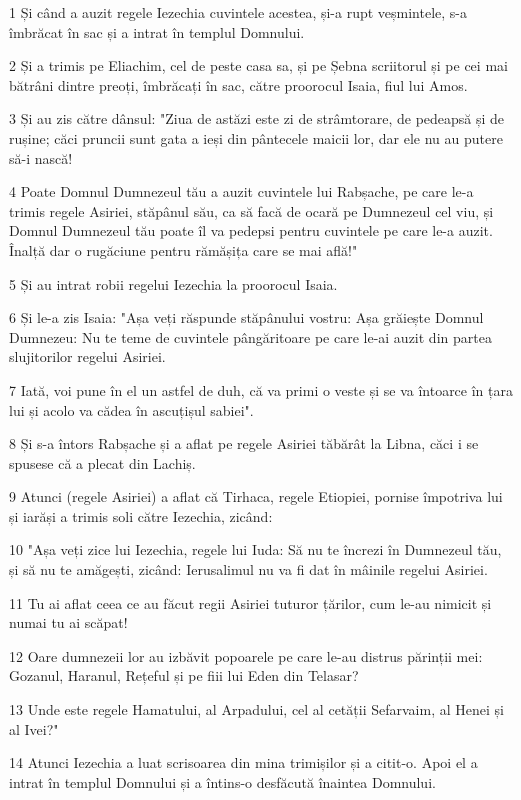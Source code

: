 \par 1 Și când a auzit regele Iezechia cuvintele acestea, și-a rupt veșmintele, s-a îmbrăcat în sac și a intrat în templul Domnului.
\par 2 Și a trimis pe Eliachim, cel de peste casa sa, și pe Șebna scriitorul și pe cei mai bătrâni dintre preoți, îmbrăcați în sac, către proorocul Isaia, fiul lui Amos.
\par 3 Și au zis către dânsul: "Ziua de astăzi este zi de strâmtorare, de pedeapsă și de rușine; căci pruncii sunt gata a ieși din pântecele maicii lor, dar ele nu au putere să-i nască!
\par 4 Poate Domnul Dumnezeul tău a auzit cuvintele lui Rabșache, pe care le-a trimis regele Asiriei, stăpânul său, ca să facă de ocară pe Dumnezeul cel viu, și Domnul Dumnezeul tău poate îl va pedepsi pentru cuvintele pe care le-a auzit. Înalță dar o rugăciune pentru rămășița care se mai află!"
\par 5 Și au intrat robii regelui Iezechia la proorocul Isaia.
\par 6 Și le-a zis Isaia: "Așa veți răspunde stăpânului vostru: Așa grăiește Domnul Dumnezeu: Nu te teme de cuvintele pângăritoare pe care le-ai auzit din partea slujitorilor regelui Asiriei.
\par 7 Iată, voi pune în el un astfel de duh, că va primi o veste și se va întoarce în țara lui și acolo va cădea în ascuțișul sabiei".
\par 8 Și s-a întors Rabșache și a aflat pe regele Asiriei tăbărât la Libna, căci i se spusese că a plecat din Lachiș.
\par 9 Atunci (regele Asiriei) a aflat că Tirhaca, regele Etiopiei, pornise împotriva lui și iarăși a trimis soli către Iezechia, zicând:
\par 10 "Așa veți zice lui Iezechia, regele lui Iuda: Să nu te încrezi în Dumnezeul tău, și să nu te amăgești, zicând: Ierusalimul nu va fi dat în mâinile regelui Asiriei.
\par 11 Tu ai aflat ceea ce au făcut regii Asiriei tuturor țărilor, cum le-au nimicit și numai tu ai scăpat!
\par 12 Oare dumnezeii lor au izbăvit popoarele pe care le-au distrus părinții mei: Gozanul, Haranul, Rețeful și pe fiii lui Eden din Telasar?
\par 13 Unde este regele Hamatului, al Arpadului, cel al cetății Sefarvaim, al Henei și al Ivei?"
\par 14 Atunci Iezechia a luat scrisoarea din mina trimișilor și a citit-o. Apoi el a intrat în templul Domnului și a întins-o desfăcută înaintea Domnului.

